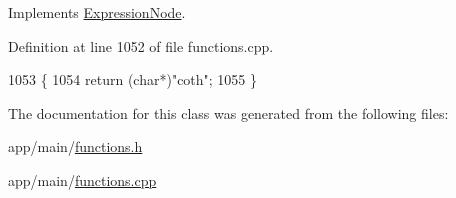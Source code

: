 Implements \hyperlink{classExpressionNode_a42a5e9562b0f645a19dcc83f698069b5}{Expression\+Node}.



Definition at line 1052 of file functions.\+cpp.


\begin{DoxyCode}
1053 \{
1054     \textcolor{keywordflow}{return} (\textcolor{keywordtype}{char}*)\textcolor{stringliteral}{"coth"};
1055 \}
\end{DoxyCode}


The documentation for this class was generated from the following files\+:\begin{DoxyCompactItemize}
\item 
app/main/\hyperlink{functions_8h}{functions.\+h}\item 
app/main/\hyperlink{functions_8cpp}{functions.\+cpp}\end{DoxyCompactItemize}
